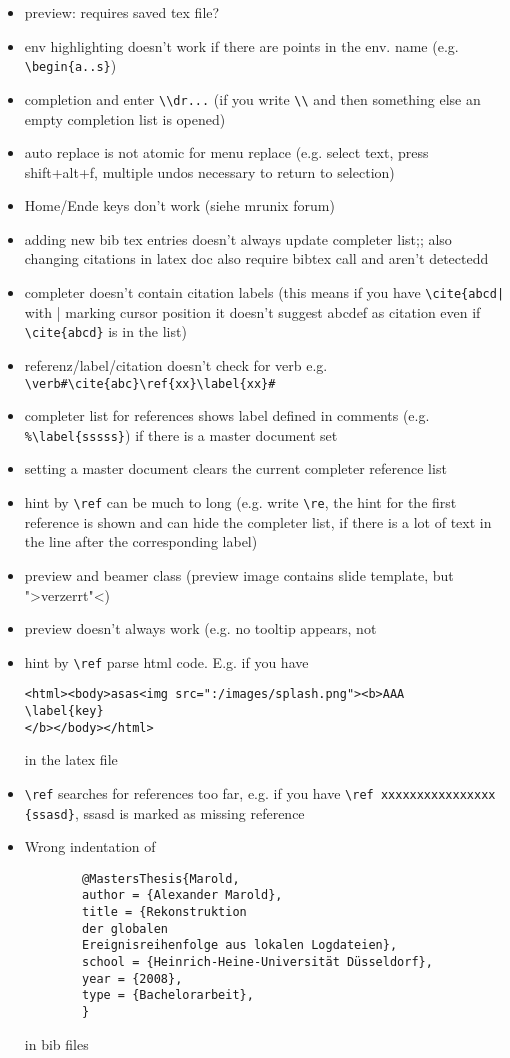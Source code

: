 \documentclass[10pt,a4paper,landscape]{report}
\begin{document}
\begin{itemize}
\item  preview: requires saved tex file?  
\item  env highlighting doesn't work if there are points in the env. name (e.g. \verb+\begin{a..s}+)
\item completion and enter \verb+\\dr...+ (if you write \verb+\\+ and then something else an empty completion list is opened)
\item auto replace is not atomic for menu replace (e.g. select text, press shift+alt+f, multiple undos necessary to return to selection)
\item Home/Ende keys don't work (siehe mrunix forum)
\item adding new bib tex entries doesn't always update completer list;; also changing citations in latex doc also require bibtex call and aren't detectedd
\item completer doesn't contain citation labels (this means if you have \verb+\cite{abcd|+ with | marking cursor position it doesn't suggest abcdef as citation even if \verb+\cite{abcd}+ is in the list)
\item referenz/label/citation doesn't check for verb e.g. \verb+\verb#\cite{abc}\ref{xx}\label{xx}#+
\item completer list for references shows label defined in comments (e.g. \verb+%\label{sssss}+) if there is a master document set
\item setting a master document clears the current completer reference list
\item hint by  \verb+\ref+  can be much to long (e.g. write \verb+\re+, the hint for the first reference is shown and can hide the completer list, if there is a lot of text in the line after the corresponding label)
\item preview and beamer class (preview image contains slide template, but ">verzerrt"<)
\item preview doesn't always work (e.g. no tooltip appears, not 
\item hint by \verb+\ref+ parse html code. E.g. if you have \begin{verbatim}
<html><body>asas<img src=":/images/splash.png"><b>AAA
\label{key}
</b></body></html>
\end{verbatim} in the latex file
\item \verb+\ref+ searches for references too far, e.g. if you have  \verb+\ref xxxxxxxxxxxxxxxx {ssasd}+, ssasd is marked as missing reference
	\item Wrong indentation of \begin{verbatim}
		@MastersThesis{Marold,
		author = {Alexander Marold},
		title = {Rekonstruktion 
		der globalen 
		Ereignisreihenfolge aus lokalen Logdateien},
		school = {Heinrich-Heine-Universität Düsseldorf},
		year = {2008},
		type = {Bachelorarbeit},
		}
	\end{verbatim} in bib files
\end{itemize} 
\end{document}
